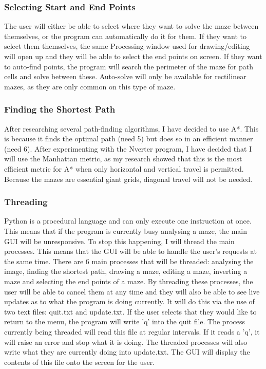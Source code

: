 \documentclass[titlepage]{article}
\begin{document}
\subsubsection{Selecting Start and End Points}
The user will either be able to select where they want to solve the maze between themselves, or the program can automatically do it for them. If they want to select them themselves, the same Processing window used for drawing/editing will open up and they will be able to select the end points on screen. If they want to auto-find points, the program will search the perimeter of the maze for path cells and solve between these. Auto-solve will only be available for rectilinear mazes, as they are only common on this type of maze. 

\subsubsection{Finding the Shortest Path}
After researching several path-finding algorithms, I have decided to use A*. This is because it finds the optimal path (need 5) but does so in an efficient manner (need 6). After experimenting with the Nverter program, I have decided that I will use the Manhattan metric, as my research showed that this is the most efficient metric for A* when only horizontal and vertical travel is permitted. Because the mazes are essential giant grids, diagonal travel will not be needed. 

\subsubsection{Threading}
Python is a procedural language and can only execute one instruction at once. This means that if the program is currently busy analysing a maze, the main GUI will be unresponsive. To stop this happening, I will thread the main processes. This means that the GUI will be able to handle the user's requests at the same time. There are 6 main processes that will be threaded: analysing the image, finding the shortest path, drawing a maze, editing a maze, inverting a maze and selecting the end points of a maze. By threading these processes, the user will be able to cancel them at any time and they will also be able to see live updates as to what the program is doing currently. It will do this via the use of two text files: quit.txt and update.txt. If the user selects that they would like to return to the menu, the program will write 'q' into the quit file. The process currently being threaded will read this file at regular intervals. If it reads a 'q', it will raise an error and stop what it is doing. The threaded processes will also write what they are currently doing into update.txt. The GUI will display the contents of this file onto the screen for the user. 
\end{document}
